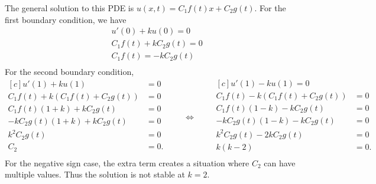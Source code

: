 \documentclass[12pt]{article}%
\begin{document}
\begin{enumerate}
\begin{enumerate}
        The general solution to this PDE is $u\left(x,t\right) = C_1 f\left(t\right)x + C_2 g\left(t\right)$. For the first boundary condition, we have
        \begin{align*}
            &u'\left(0\right) + ku\left(0\right) = 0 \\
            &C_1 f\left(t\right) + k C_2 g\left(t\right) = 0 \\
            &C_1 f\left(t\right) = -k C_2 g\left(t\right) \\
        \end{align*}
        For the second boundary condition, 
        \begin{equation*}
            \begin{aligned}[c]
                u'\left(1\right) + ku\left(1\right) &= 0 \\
                C_1 f\left(t\right) + k \left(C_1 f\left(t\right) + C_2 g\left(t\right) \right) &= 0 \\
                C_1 f\left(t\right)\left(1+k\right)  + k C_2 g\left(t\right) &= 0 \\
                -k C_2 g\left(t\right) \left(1+k\right)  + k C_2  g\left(t\right) &= 0 \\
                k^2 C_2  g\left(t\right) &= 0 \\
                C_2 &= 0. \\
            \end{aligned}
            \qquad\Longleftrightarrow\qquad
            \begin{aligned}[c]
                u'\left(1\right) - ku\left(1\right) = 0 \\
                C_1 f\left(t\right) - k \left(C_1 f\left(t\right) + C_2 g\left(t\right) \right) &= 0 \\
                C_1 f\left(t\right)\left(1-k\right)  - k C_2 g\left(t\right) &= 0 \\
                -k C_2 g\left(t\right) \left(1-k\right)  - k C_2 g\left(t\right) &= 0 \\
                k^2 C_2  g\left(t\right) - 2k C_2 g\left(t\right) &= 0 \\
                k\left(k-2\right) &= 0. \\
            \end{aligned}
        \end{equation*}
        For the negative sign case, the extra term creates a situation where $C_2$ can have multiple values.  Thus the solution is not stable at $k=2$.   \checkmark \\
    \end{enumerate}


\end{enumerate}
\end{document}
